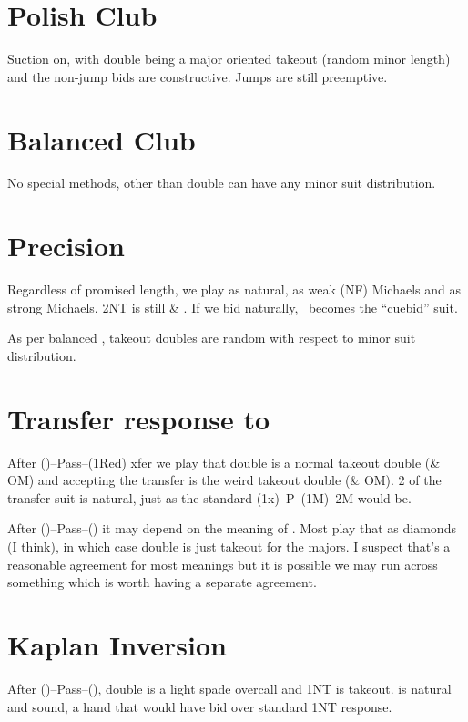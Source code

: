 \documentclass[tom-ari]{subfile}
\begin{document}
	\section{Polish Club}
	
	Suction on, with double being a major oriented takeout (random minor length) and the non-jump bids are constructive. Jumps are still preemptive.
	
	\section{Balanced Club}
	
	No special methods, other than double can have any minor suit distribution.
	
	\section[Precision 1D]{Precision }
	
	Regardless of promised length, we play  as natural,  as weak (NF) Michaels and  as strong Michaels. 2NT is still \heartsuit \& \clubsuit. If we bid  naturally, \clubsuit ~becomes the ``cuebid'' suit.
	
	As per balanced , takeout doubles are random with respect to minor suit distribution.
	
	\section[Transfer response to 1C]{Transfer response to }
	
	After ()--Pass--(1Red) xfer we play that double is a normal takeout double (\diamondsuit \& OM) and accepting the transfer is the weird takeout double (\clubsuit \& OM). 2 of the transfer suit is natural, just as the standard (1x)--P--(1M)--2M would be.
	
	After ()--Pass--() it may depend on the meaning of . Most play that as diamonds (I think), in which case double is just takeout for the majors. I suspect that's a reasonable agreement for most  meanings but it is possible we may run across something which is worth having a separate agreement.
	
	\section{Kaplan Inversion}
	
	After ()--Pass--(), double is a light spade overcall and 1NT is takeout.  is natural and sound, a hand that would have bid  over standard 1NT response.
	
\end{document}
